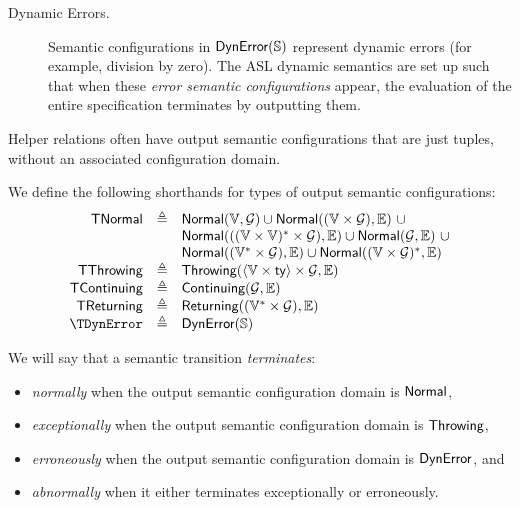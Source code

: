 \begin{description}
  \hypertarget{def-error}{}
  \item[Dynamic Errors.] Semantic configurations in $\textsf{DynError}(\mathbb{S})$
  represent dynamic errors (for example, division by zero).
  The ASL dynamic semantics are set up such that when these \emph{error semantic configurations} appear,
  the evaluation of the entire specification terminates by outputting them.
\end{description}
Helper relations often have output semantic configurations that are just tuples, without an associated configuration domain.

We define the following shorthands for types of output semantic configurations:
\hypertarget{def-tnormal}{}
\hypertarget{def-tcontinuing}{}
\hypertarget{def-tthrowing}{}
\hypertarget{def-treturning}{}
\hypertarget{def-terror}{}
\[
  \begin{array}{rcl}
    \TNormal          & \triangleq & \Normal(\vals, \XGraphs) \cup \Normal((\vals \times \XGraphs), \envs)\ \cup \\
                      &            & \Normal(((\vals \times \vals)^* \times \XGraphs), \envs) \cup  \Normal(\XGraphs, \envs)\ \cup   \\
                      &            & \Normal((\vals^* \times \XGraphs), \envs) \cup \Normal((\vals\times\XGraphs)^*, \envs)\\
    \TThrowing        & \triangleq & \Throwing(\langle\vals \times \ty\rangle \times \XGraphs, \envs)\\
    \TContinuing      & \triangleq & \Continuing(\XGraphs, \envs)\\
    \TReturning       & \triangleq & \Returning((\vals^* \times \XGraphs), \envs)\\
    \TDynError           & \triangleq & \Error(\Strings)\\
  \end{array}
\]

We will say that a semantic transition \emph{terminates}:
\begin{itemize}
\item \emph{normally} when the output semantic configuration domain is
$\textsf{Normal}$,
\item \emph{exceptionally} when the output semantic configuration domain is
$\textsf{Throwing}$,
\item \emph{erroneously} when the output semantic configuration domain is
$\textsf{DynError}$, and
\item \emph{abnormally} when it either terminates exceptionally or
erroneously.
\end{itemize}

